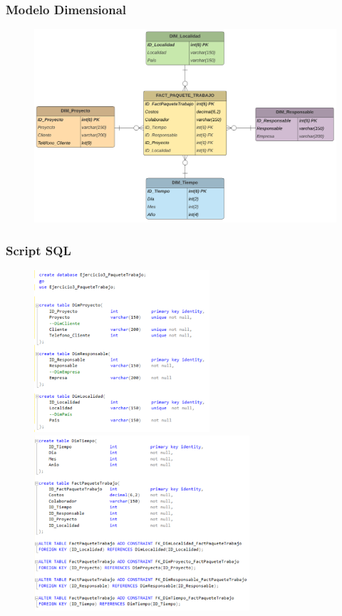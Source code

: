 \documentclass[12pt,letterpaper]{article}
\begin{document}
\subsubsection{\textbf{Modelo Dimensional }}

	\begin{figure}[htb]
		\begin{center}
			\includegraphics[width=14cm]{./Imagenes/mod_dimensional_3}
			
		\end{center}
	\end{figure}

\subsubsection{\textbf{Script SQL }}

	\begin{figure}[htb]
		\begin{center}
			\includegraphics[width=6.5cm]{./Imagenes/Ejercicio3_script1}
			\includegraphics[width=8cm]{./Imagenes/Ejercicio3_script2}
		\end{center}
	\end{figure}
\newpage
\end{document}
